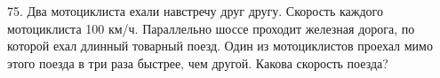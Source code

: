 75. Два мотоциклиста ехали навстречу друг другу. Скорость каждого мотоциклиста 100 км/ч. Параллельно шоссе проходит железная дорога, по которой ехал длинный товарный поезд. Один из мотоциклистов проехал мимо этого поезда в три раза быстрее, чем другой. Какова скорость поезда?\\
